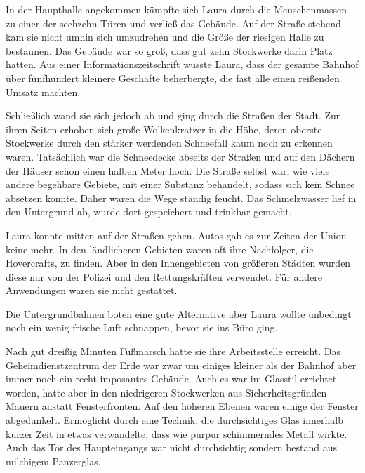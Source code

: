 \par

In der Haupthalle angekommen kämpfte sich Laura durch die Menschenmassen zu einer der sechzehn Türen und verließ das Gebäude. Auf der Straße stehend kam sie nicht umhin sich umzudrehen und die Größe der riesigen Halle zu bestaunen. Das Gebäude war so groß, dass gut zehn Stockwerke darin Platz hatten. Aus einer Informationszeitschrift wusste Laura, dass der gesamte Bahnhof über fünfhundert kleinere Geschäfte beherbergte, die fast alle einen reißenden Umsatz machten.

\par

Schließlich wand sie sich jedoch ab und ging durch die Straßen der Stadt. Zur ihren Seiten erhoben sich große Wolkenkratzer in die Höhe, deren oberste Stockwerke durch den stärker werdenden Schneefall kaum noch zu erkennen waren. Tatsächlich war die Schneedecke abseits der Straßen und auf den Dächern der Häuser schon einen halben Meter hoch. Die Straße selbst war, wie viele andere begehbare Gebiete, mit einer Substanz behandelt, sodass sich kein Schnee absetzen konnte. Daher waren die Wege ständig feucht. Das Schmelzwasser lief in den Untergrund ab, wurde dort gespeichert und trinkbar gemacht.

\par

Laura konnte mitten auf der Straßen gehen. Autos gab es zur Zeiten der Union keine mehr. In den ländlicheren Gebieten waren oft ihre Nachfolger, die Hovercrafts, zu finden. Aber in den Innengebieten von größeren Städten wurden diese nur von der Polizei und den Rettungskräften verwendet. Für andere Anwendungen waren sie nicht gestattet.

\par

Die Untergrundbahnen boten eine gute Alternative aber Laura wollte unbedingt noch ein wenig frische Luft schnappen, bevor sie ins Büro ging.

\par

Nach gut dreißig Minuten Fußmarsch hatte sie ihre Arbeitsstelle erreicht. Das Geheimdienstzentrum der Erde war zwar um einiges kleiner als der Bahnhof aber immer noch ein recht imposantes Gebäude. Auch es war im Glasstil errichtet worden, hatte aber in den niedrigeren Stockwerken aus Sicherheitsgründen Mauern anstatt Fensterfronten. Auf den höheren Ebenen waren einige der Fenster abgedunkelt. Ermöglicht durch eine Technik, die durchsichtiges Glas innerhalb kurzer Zeit in etwas verwandelte, dass wie purpur schimmerndes Metall wirkte. Auch das Tor des Haupteingangs war nicht durchsichtig sondern bestand aus milchigem Panzerglas.

